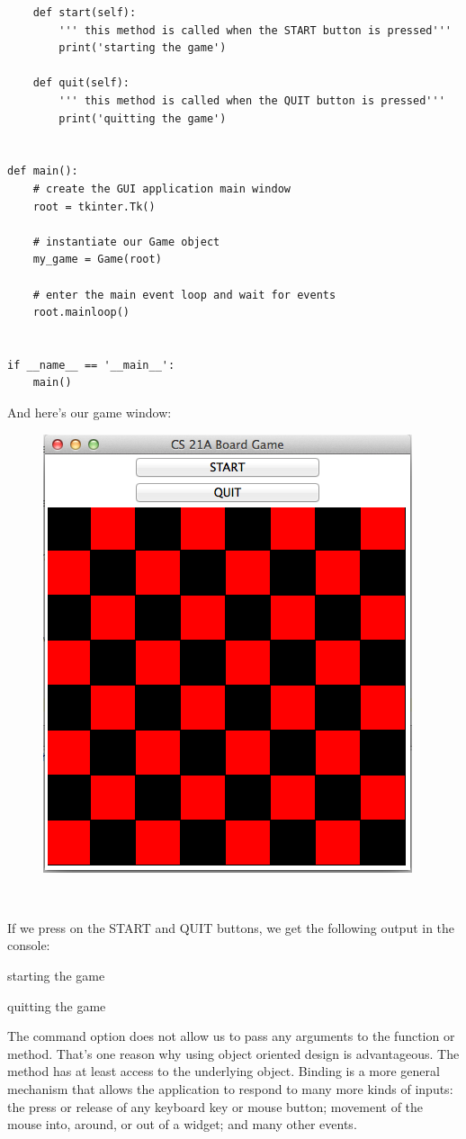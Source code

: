 \documentclass{article}
\begin{document}
\begin{lstlisting}
    def start(self):
        ''' this method is called when the START button is pressed'''
        print('starting the game')

    def quit(self):
        ''' this method is called when the QUIT button is pressed'''
        print('quitting the game')


def main():
    # create the GUI application main window
    root = tkinter.Tk()

    # instantiate our Game object
    my_game = Game(root)

    # enter the main event loop and wait for events
    root.mainloop()


if __name__ == '__main__':
    main()
\end{lstlisting}

And here's our game window:

\begin{figure}[h]
\includegraphics[scale=.6]{guiboard}
\end{figure}\
 
If we press on the START and QUIT buttons, we get the following output in the console:

starting the game

quitting the game

The command option does not allow us to pass any arguments to the function or method. That's one reason why using object oriented design is advantageous.  The method has at least access to the underlying object.
Binding is a more general mechanism that allows the application to respond to many more kinds of inputs: the press or release of any keyboard key or mouse button; movement of the mouse into, around, or out of a widget; and many other events.
\end{document}
